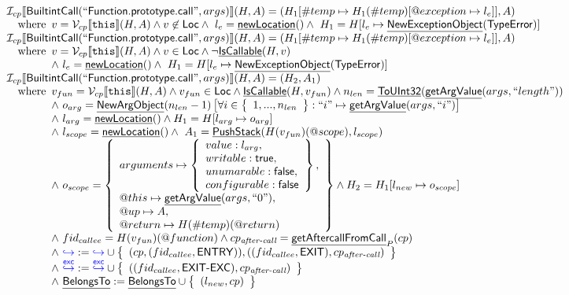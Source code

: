 \documentclass{article}
\makeatletter
\newcommand{\SF}[1]{\mbox{\textsf{#1}}}
\newcommand{\TT}[1]{\mbox{\texttt{#1}}}
\newcommand{\cfgnext}{\hookrightarrow}
\newcommand{\excnext}{\stackrel{\mathsf{exc}}{\hookrightarrow}}
\newcommand{\wherec}[1]{{\rm where}\begin{array}[t]{l}#1\end{array}}
\newcommand{\I}{\mathcal{I}}
\newcommand{\V}{\mathcal{V}}
\newcommand{\set}[1]{\left\{\begin{array}{l}#1\end{array}\right\}}
\newcommand{\lbr}{\llbracket}
\newcommand{\rbr}{\rrbracket}
\newcommand{\hf}[1]{\underline{\sf #1}}
\newcommand{\varloc}[1]{\##1}
\newcommand{\varprop}[1]{@#1}
\def\inblue{\color{blue}}
\def\inblue{\color{blue}}
\makeatother
\begin{document}
\[
\begin{array}{l}
\I _{cp}\lbr \SF{BuiltintCall}(``\SF{Function.prototype.call}",args)\rbr(H,A)
 = (H_1[\varloc{temp}\mapsto H_1(\varloc{temp})[\varprop{exception}\mapsto l_e]], A) \\
\quad\wherec{
  v = \V _{cp}\lbr \TT{this}\rbr (H,A) \land v \not\in \SF{Loc}
  \land\ l_e = \hf{newLocation}() \land\ H_1=H[l_e\mapsto\hf{NewExceptionObject}(\SF{TypeError})] 
  }\\
  \I _{cp}\lbr \SF{BuiltintCall}(``\SF{Function.prototype.call}",args)\rbr(H,A)

 = (H_1[\varloc{temp}\mapsto H_1(\varloc{temp})[\varprop{exception}\mapsto l_e]], A) \\
\quad\wherec{
  v = \V _{cp}\lbr \TT{this}\rbr (H,A) \land v \in \SF{Loc} \land \neg \hf{IsCallable}(H,v)\\
  \land\ l_e = \hf{newLocation}() \land\ H_1=H[l_e\mapsto\hf{NewExceptionObject}(\SF{TypeError})] 
  }\\
  
\I _{cp}\lbr \SF{BuiltintCall}(``\SF{Function.prototype.call}",args)\rbr(H,A) = (H_2, A_1) \\
\quad\wherec{
  v_{fun} = \V _{cp}\lbr \TT{this}\rbr (H,A) \land v_{fun} \in \SF{Loc} \land \hf{IsCallable}(H,v_{fun})
  \land n_{len} = \hf{ToUInt32}(\hf{getArgValue}(args, ``length"))\\
  \land\ o_{arg} = \hf{NewArgObject}(n_{len}-1)\left[ \forall i \in \set{1, ..., n_{len}}: 
    ``i" \mapsto \hf{getArgValue}(args, ``i") \right] \\
  \land\ l_{arg} = \hf{newLocation}()\land H_1 = H[l_{arg} \mapsto o_{arg}]\\
  \land\ l_{scope} = \hf{newLocation}()
  \land\ A_1=\hf{PushStack}(H(v_{fun})(\varprop{scope}),l_{scope}) \\
  \land\ o_{scope} = \set{
    arguments \mapsto \set{value : l_{arg},\\ 
      writable : \SF{true},\\ unumarable : \SF{false},\\ configurable : \SF{false}},\\
    \varprop{this} \mapsto \hf{getArgValue}(args, ``0"),\\
    \varprop{up} \mapsto A,\\
    \varprop{return} \mapsto H(\varloc{temp})(\varprop{return})}
  \land H_2 = H_1[l_{new} \mapsto o_{scope}]\\
  \land\ fid_{callee}= H(v_{fun})(\varprop{function})
  \land cp_{\textit{after-call}} = \hf{getAftercallFromCall}_P(cp) \\
  \land\ {\inblue \cfgnext} :=
  {\inblue \cfgnext}\cup\set{( cp,(fid_{callee},\SF{ENTRY})),
    ((fid_{callee},\SF{EXIT}), cp_{\textit{after-call}})}\\
  \land\ {\inblue \excnext}:={\inblue \excnext}
  \cup\set{((fid_{callee},\SF{EXIT-EXC}), cp_{\textit{after-call}})}\\
  \land\ \hf{BelongsTo}:=\hf{BelongsTo}\cup\set{(l_{new},cp)}
} \\
\\\\




\end{array}\]
\end{document}
